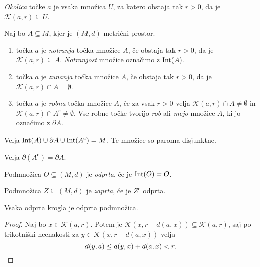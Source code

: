 \documentclass[12pt, a4paper]{article}
\begin{document}
\begin{definicija}
\emph{Okolica} točke $a$ je vsaka množica $U$, za katero obstaja tak $r>0$, da je $\mathcal{K}(a,r)\subseteq U$.
\end{definicija}

\begin{definicija}
Naj bo $A\subseteq M$, kjer je $(M,d)$ metrični prostor.

\begin{enumerate}[label=\roman*)]
\item točka $a$ je \emph{notranja} točka množice $A$, če obstaja tak $r>0$, da je $\mathcal{K}(a,r)\subseteq A$. \emph{Notranjost} množice označimo z $\operatorname{Int}(A)$.
\item točka $a$ je \emph{zunanja} točka množice $A$, če obstaja tak $r>0$, da je $\mathcal{K}(a,r)\cap A=\emptyset$.
\item točka $a$ je \emph{robna} točka množice $A$, če za vsak $r>0$ velja $\mathcal{K}(a,r)\cap A\ne\emptyset$ in  $\mathcal{K}(a,r)\cap A^\mathsf{c}\ne\emptyset$. Vse robne točke tvorijo \emph{rob} ali \emph{mejo} množice $A$, ki jo označimo z $\partial A$.
\end{enumerate}
\end{definicija}

\begin{opomba}
Velja $\operatorname{Int}(A)\cup\partial A\cup\operatorname{Int}(A^\mathsf{c})=M$. Te množice so paroma disjunktne.
\end{opomba}

\begin{opomba}
Velja $\partial(A^\mathsf{c})=\partial A$.
\end{opomba}

\begin{definicija}
Podmnožica $O\subseteq(M,d)$ je \emph{odprta}, če je $\operatorname{Int}(O)=O$.
\end{definicija}

\begin{definicija}
Podmnožica $Z\subseteq(M,d)$ je \emph{zaprta}, če je $Z^\mathsf{c}$ odprta.
\end{definicija}

\begin{trditev}
Vsaka odprta krogla je odprta podmnožica.
\end{trditev}

\begin{proof}
Naj bo $x\in\mathcal{K}(a,r)$. Potem je $\mathcal{K}(x,r-d(a,x))\subseteq\mathcal{K}(a,r)$, saj po trikotniški neenakosti za $y\in\mathcal{K}(x,r-d(a,x))$ velja
\[
d(y,a)\leq d(y,x)+d(a,x)<r.\qedhere
\]
\end{proof}
\end{document}

